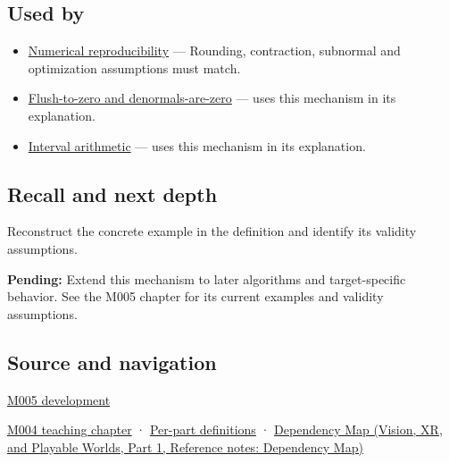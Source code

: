 \subsection{Used by}\label{appendix-f11d1a521253-used-by}

\hypertarget{appendix-f11d1a521253-used-by}{}

\begin{itemize}
\item
  \hyperref[appendix-5f1a2c3f97ff]{Numerical reproducibility} --- Rounding, contraction, subnormal and optimization assumptions must match.
\item
  \hyperref[appendix-e979eb012782]{Flush-to-zero and denormals-are-zero} --- uses this mechanism in its explanation.
\item
  \hyperref[appendix-1823a14330cb]{Interval arithmetic} --- uses this mechanism in its explanation.
\end{itemize}

\subsection{Recall and next depth}\label{appendix-f11d1a521253-recall-and-next-depth}

\hypertarget{appendix-f11d1a521253-recall-and-next-depth}{}

Reconstruct the concrete example in the definition and identify its validity assumptions.

\textbf{Pending:} Extend this mechanism to later algorithms and target-specific behavior. See the M005 chapter for its current examples and validity assumptions.

\subsection{Source and navigation}\label{appendix-f11d1a521253-source-and-navigation}

\hypertarget{appendix-f11d1a521253-source-and-navigation}{}

\hyperref[01-foundations-i-ch001-when-arithmetic-meets-uncertainty]{M005 development}

\hyperref[01-foundations-i-ch001-a-stretching-ruler-for-real-valued-quantities]{M004 teaching chapter} · \hyperref[appendix-fd090d982a15-m004---parts-61-76]{Per-part definitions} · \href{../07-Vision-XR-and-Playable-Worlds-P01/main.pdf\#nameddest=appendix-4ad47bdd269a}{Dependency Map (Vision, XR, and Playable Worlds, Part 1, Reference notes: Dependency Map)}
